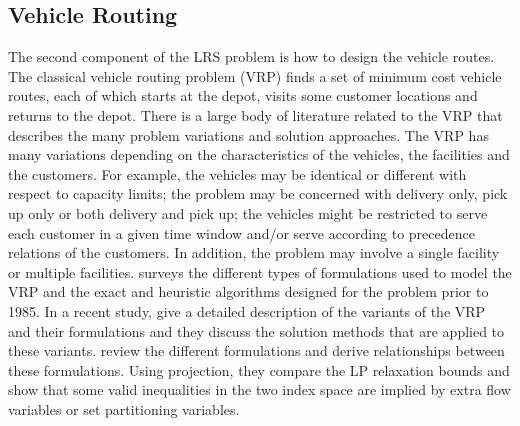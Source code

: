 \subsection{Vehicle Routing}
\label{lit-vrp}
The second component of the LRS problem is how to design the vehicle routes. The 
classical vehicle routing problem (VRP) finds a set of minimum cost vehicle 
routes, each of which starts at the depot, visits some customer locations and 
returns to the depot. There is a large body of literature related to the VRP that 
describes the many problem variations and solution approaches. The VRP has many 
variations depending on the characteristics of the vehicles, the facilities and 
the customers. 
For example, the vehicles may be identical or different with respect to capacity 
limits; the problem may be concerned with delivery only, pick up only or both 
delivery and pick up; the vehicles might be restricted to serve each customer in 
a given time window and/or serve according to precedence relations of the customers.
In addition, the problem may involve a single facility or multiple facilities.  
\citet {Christofides} surveys the different types of formulations used to model 
the VRP and the exact and heuristic algorithms designed for the problem prior to 1985. 
In a recent study, \citet{Toth} give a detailed description of the variants of the 
VRP and their formulations and they discuss the solution methods that are applied 
to these variants. 
\citet{LetchfordG06} review the different formulations and derive
relationships between these formulations. Using projection, they compare the LP 
relaxation bounds and show that some valid inequalities in the two index space
are implied by extra flow variables or set partitioning variables.


